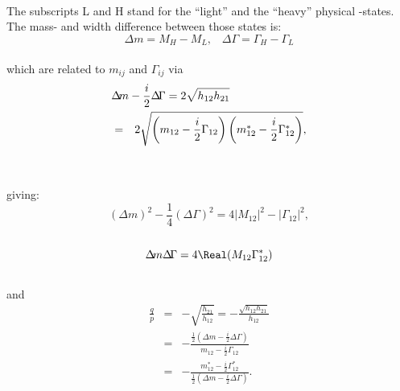 \\
 The subscripts L and H stand for the ``light'' and the ``heavy''
 physical \Bo-states. The mass- and width difference between those
 states is:
\begin{equation}
\Delta\!m = M_H-M_L, \;\;\;
\Delta\!\Gamma=\Gamma_H-\Gamma_L
\end{equation}\\
which are related to $m_{ij}$ and $\Gamma_{ij}$ via
{\small
\begin{eqnarray}
\lefteqn{\Delta\!m - \frac{i}{2}\Delta\!\Gamma =2\sqrt{h_{12} h_{21}}} 
\nonumber \\
&=&
2\sqrt{\left(m_{12}-\frac{i}{2}\Gamma_{12}\right)
\left(m^*_{12}-\frac{i}{2}\Gamma^*_{12}\right)} 
,
\nonumber \\
\mbox{}
\end{eqnarray}
}\\
giving:
\begin{equation}
\left(\Delta\!m\right)^2 - \frac{1}{4}\left(\Delta\!\Gamma\right)^2
 = 
 4 \left|M_{12}\right|^2 - \left|\Gamma_{12}\right|^2,
\end{equation}\\
\begin{equation}
\Delta\!m \Delta\!\Gamma
 = 4\Real\!\left(M_{12}\Gamma^*_{12}\right)
\end{equation}\\
and
\begin{eqnarray}
\label{eq:th.a.qbypis}
\frac{q}{p}&=&-\sqrt{\frac{h_{21}}{h_{12}}} =
-\frac{\sqrt{h_{12}h_{21}}}{h_{12}} \nonumber\\
&=& -\frac{ \frac{1}{2}\left(\Delta\!m - \frac{i}{2}\Delta\!\Gamma
\right) }{m_{12} - \frac{i}{2} \Gamma_{12}}\nonumber\\
&=& -\frac{m^*_{12} - \frac{i}{2} \Gamma^*_{12}}{
\frac{1}{2}\left(\Delta\!m - \frac{i}{2}\Delta\!\Gamma
\right) }
.
\end{eqnarray}

